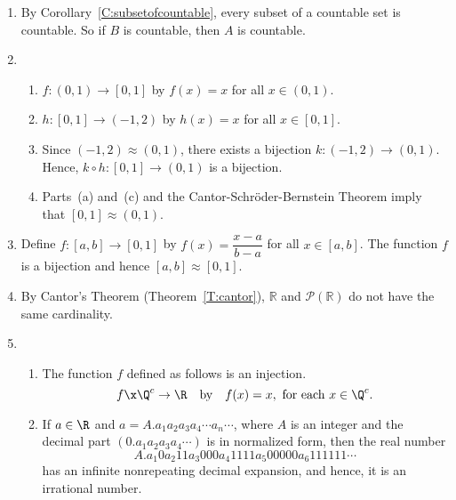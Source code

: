 \begin{enumerate}
\item By Corollary~\ref{C:subsetofcountable}, every subset of a countable set is countable.  So if 
$B$ is countable, then $A$ is countable.

\item \begin{enumerate}
\item $f: \left( 0, 1 \right) \to \left[ 0, 1 \right]$ by $f \left( x \right) = x$ for all 
$x \in \left( 0, 1 \right)$.

\item $h: \left[ 0, 1 \right] \to \left( -1, 2 \right)$ by $h \left( x \right) = x$ for all 
$x \in \left[ 0, 1 \right]$.

\item Since $\left( -1, 2 \right) \approx \left( 0, 1 \right)$, there exists a bijection 
$k: \left( -1, 2 \right) \to \left( 0, 1 \right)$.  Hence, 
$k \circ h : \left[0, 1 \right] \to  \left( 0, 1 \right)$ is a bijection.

\item Parts~(a) and~(c) and the Cantor-Schr\"{o}der-Bernstein Theorem imply that 
$\left[0, 1 \right] \approx \left( 0, 1 \right)$.
\end{enumerate}

\item Define $f: \left[ a, b \right] \to \left[ 0, 1 \right]$ by 
$f \left( x \right) = \dfrac{x - a}{b - a}$ for all $x \in \left[ a, b \right]$.  The function 
$f$ is a bijection and hence $\left[ a, b \right] \approx \left[ 0, 1 \right]$.

\item By Cantor's Theorem (Theorem~\ref{T:cantor}), $\mathbb{R}$ and 
$\mathcal{P} \left( \mathbb{R} \right)$ do not have the same cardinality.



\item \begin{enumerate}
\item The function $f$ defined as follows is an injection.
\[
f\x \Q^c \to \R \quad \text{by} \quad f(x) = x, \text{ for each } x \in \Q^c.
\]

\item If $a \in \R$ and $a = A.a_1 a_2 a_3 a_4 \cdots a_n \cdots$, where $A$ is an integer and the decimal part $( 0.a_1 a_2 a_3 a_4 \cdots )$ is in normalized form, then the real number
\[
A.a_1 0 a_2 1 1 a_3 0 0 0 a_4 1 1 1 1 a_5 0 0 0 0 0 a_6 1 1 1 1 1 1 \cdots 
\]
has an infinite nonrepeating decimal expansion, and hence, it is an irrational number.


\end{enumerate}
\end{enumerate}
